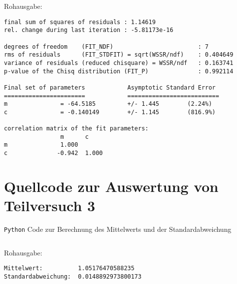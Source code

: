     \vspace{-\baselineskip}
    Rohausgabe:
    \begin{verbatim}
final sum of squares of residuals : 1.14619
rel. change during last iteration : -5.81173e-16

degrees of freedom    (FIT_NDF)                        : 7
rms of residuals      (FIT_STDFIT) = sqrt(WSSR/ndf)    : 0.404649
variance of residuals (reduced chisquare) = WSSR/ndf   : 0.163741
p-value of the Chisq distribution (FIT_P)              : 0.992114

Final set of parameters            Asymptotic Standard Error
=======================            ==========================
m               = -64.5185         +/- 1.445        (2.24%)
c               = -0.140149        +/- 1.145        (816.9%)

correlation matrix of the fit parameters:
                m      c      
m               1.000 
c              -0.942  1.000
    \end{verbatim}
\section{Quellcode zur Auswertung von Teilversuch 3}
    \label{appdx:pythontv3}
    \texttt{Python} Code zur Berechnung des Mittelwerts und der Standardabweichung
    \inputminted[linenos,breaklines,autogobble,frame=leftline,framesep=10pt]{python}{./code/tv3.py}
    Rohausgabe:
    \begin{verbatim}
Mittelwert:          1.05176470588235
Standardabweichung:  0.0148892973800173
    \end{verbatim}
